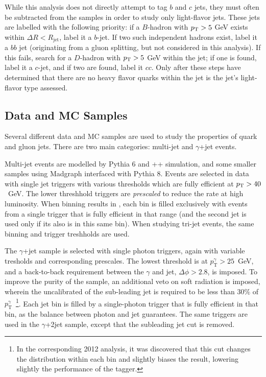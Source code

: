 While this analysis does not directly attempt to tag $b$ and $c$ jets, they must often be subtracted from the samples in order to study only light-flavor jets. These jets are labelled with the following priority: if a $B$-hadron with $p_{\text{T}} > 5$ GeV exists within $\Delta R < R_\mathrm{jet}$, label it a $b$-jet. If two such independent hadrons exist, label it a $bb$ jet (originating from a gluon splitting, but not considered in this analysis). If this fails, search for a $D$-hadron with $p_{\text{T}} > 5$ GeV within the jet; if one is found, label it a $c$-jet, and if two are found, label it $cc$. Only after these steps have determined that there are no heavy flavor quarks within the jet is the jet's light-flavor type assessed.

\subsection{Data and MC Samples}
\label{jet-reconstruction:qg:samples}

Several different data and MC samples are used to study the properties of quark and gluon jets. There are two main categories: multi-jet and $\gamma$+jet events. 

Multi-jet events are modelled by {\sc Pythia 6} and \Herwig++ simulation, and some smaller samples using {\sc Madgraph} interfaced with {\sc Pythia 8}. Events are selected in data with single jet triggers with various thresholds which are fully efficient at $p_{\text{T}} > 40$~GeV. The lower \pt threshhold triggers are \textit{prescaled} to reduce the rate at high luminosity. When binning results in \pt, each bin is filled exclusively with events from a single trigger that is fully efficient in that range (and the second jet is used only if its \pt also is in this same bin). When studying tri-jet events, the same \pt binning and trigger treshholds are used.

The $\gamma$+jet sample is selected with single photon triggers, again with variable tresholds and corresponding prescales. The lowest threshold is at $p_\mathrm{T}^\gamma > 25$~GeV, and a back-to-back requirement between the $\gamma$ and jet, $\Delta \phi > 2.8$, is imposed. To improve the purity of the sample, an additional veto on soft radiation is imposed, wherein the uncalibrated \pt of the sub-leading jet is required to be less than $30\%$ of $p_\mathrm{T}^\gamma$~\cite{JES2010}\footnote{In the corresponding 2012 analysis, it was discovered that this cut changes the \pt distribution within each \pt bin and slightly biases the result, lowering slightly the performance of the tagger.}. Each jet \pt bin is filled by a single-photon trigger that is fully efficient in that bin, as the balance between photon and jet guarantees. The same triggers are used in the $\gamma$+2jet sample, except that the subleading jet \pt cut is removed.

